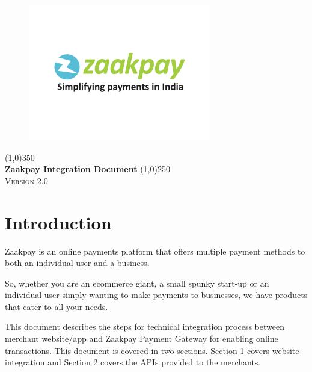 \documentclass{article}
\begin{document}
\begin{titlepage}
\begin{center}
\begin{figure}[H]
\centering
\includegraphics[width=2.8 in]{306.png}
\end{figure}
\line(1,0){350}\\
\huge{\bfseries Zaakpay Integration Document}
\line(1,0){250}\\
[1.5cm]
\textsc{\Large Version 2.0}
\end{center}


\end{titlepage}
\thispagestyle{empty}
\tableofcontents
\thispagestyle{empty}
\newpage
\listoffigures
\listoftables
\thispagestyle{empty}
\cleardoublepage
\setcounter{page}{1}
\section{Introduction}\label{sec:Intro}
Zaakpay is an online payments platform that offers multiple payment methods to both an individual user and a business. 

So, whether you are an ecommerce giant, a small spunky start-up or an individual user simply wanting to make payments to businesses, we have products that cater to all your needs.

This document describes the steps for technical integration process between merchant website/app and Zaakpay Payment Gateway for enabling online transactions. This document is covered in two sections. Section 1 covers website integration and Section 2 covers the APIs provided to the merchants.
\end{document}
